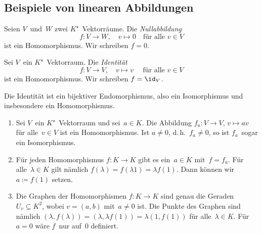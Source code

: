 \documentclass[a4paper]{article}
\begin{document}
\subsection{Beispiele von linearen Abbildungen}

\begin{definition}[Nullabbildung]
    Seien $V$~und~$W$ zwei $K$"~Vektorräume. Die \emph{Nullabbildung}
    \begin{equation*}
        f\colon V \to W,\quad v \mapsto 0 \quad\text{für alle } v \in V
    \end{equation*}
    ist ein Homomorphismus. Wir schreiben $f = 0$.
\end{definition}

\begin{definition}[Identität]
    Sei $V$~ein $K$"~Vektorraum. Die \emph{Identität}
    \begin{equation*}
        f\colon V \to V,\quad v \mapsto v \quad\text{ für alle } v \in V
    \end{equation*}
    ist ein Homomorphismus. Wir schreiben $f = \id_V$.
\end{definition}

Die Identität ist ein bijektiver Endomorphismus, also ein Isomorphismus und insbesondere ein Homomorphismus.

\begin{example}\leavevmode
    \begin{enumerate}
        \item Sei $V$~ein $K$"~Vektorraum und sei~$a \in K$. Die Abbildung $f_a\colon V \to V$, $v \mapsto av$ für alle~$v \in V$ ist ein Homomorphismus. Ist $a \neq 0$, d.\,h.\ $f_a \neq 0$, so ist $f_a$~sogar ein Isomorphismus.
        \item Für jeden Homomorphismus $f\colon K \to K$ gibt es ein~$a \in K$ mit~$f = f_a$. Für alle~$\lambda \in K$ gilt nämlich $f(\lambda) = f(\lambda1) = \lambda f(1)$. Dann können wir $a \coloneqq f(1)$ setzen.
        \item Die Graphen der Homomorphismen $f\colon K \to K$ sind genau die Geraden~$U_v \subseteq K^2$, wobei $v = (a,b)$ mit~$a \neq 0$ ist. Die Punkte des Graphen sind nämlich $(\lambda,f(\lambda)) = (\lambda,\lambda f(1)) = \lambda(1,f(1))$ für alle~$\lambda \in K$. Für~$a = 0$ wäre $f$~nur auf~$0$ definiert.
    \end{enumerate}
\end{example}
\end{document}
